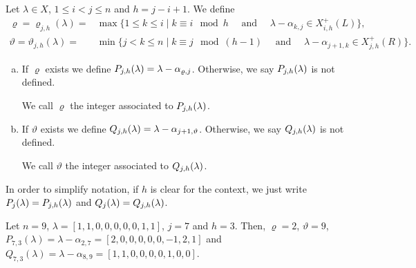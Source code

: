 \begin{definition}\rm \label{def. p and q}
Let $\lambda \in X$, $1\leq i<j \leq n$ and $h=j-i+1$. 
We define
\begin{equation}
\begin{array}{ll}
   \varrho = \varrho_{j,h}(\lambda )  = &   \displaystyle  \max \{   1\leq k \leq i \mid k\equiv i \mod h \quad \mbox{ and } \quad \lambda -\alpha_{k,j} \in X_{i,h}^+(L)     \}, \\[3pt]
 \vartheta=   \vartheta_{j,h}(\lambda)  = &   \displaystyle \min \{ j< k \leq n \mid k\equiv j \mod (h -1) \quad \mbox{ and } \quad  \lambda -\alpha_{j+1,k } \in X_{j,h}^+(R)     \}.
\end{array}
\end{equation} 


\begin{enumerate}[(a)]
    \item If $\varrho$ exists we define $P_{j,h}(\lambda)= \lambda-\alpha_{\varrho,j}$. Otherwise, we say $P_{j,h}(\lambda)$ is not defined. 
    
    We call $\varrho$ the integer associated to $P_{j,h}(\lambda)$.
    \item If $\vartheta$ exists we define $Q_{j,h}(\lambda) =\lambda-\alpha_{j+1,\vartheta}$. Otherwise, we say $Q_{j,h}(\lambda)$ is not defined. 
    
    We call $\vartheta $ the integer associated to $Q_{j,h}(\lambda)$.
\end{enumerate}
In order to simplify notation, if $h$ is clear for the context, we just write
$ P_{j}(\lambda) =P_{j,h}(\lambda)  $ and $Q_{j}(\lambda)=Q_{j,h}(\lambda) $.
\end{definition}


\begin{example}\rm
Let $n=9$, $\lambda=[1,1,0,0,0,0,0,1,1]$, $j=7$ and  $h=3$. 
Then, $\varrho =2$, $\vartheta = 9$, 
    $P_{7,3}(\lambda) = \lambda -\alpha_{2,7} = [2,0,0,0,0,0,-1,2,1] $ and  $Q_{7,3}(\lambda) = \lambda - \alpha_{8,9}= [1,1,0,0,0,0,1,0,0]$.
\end{example}


